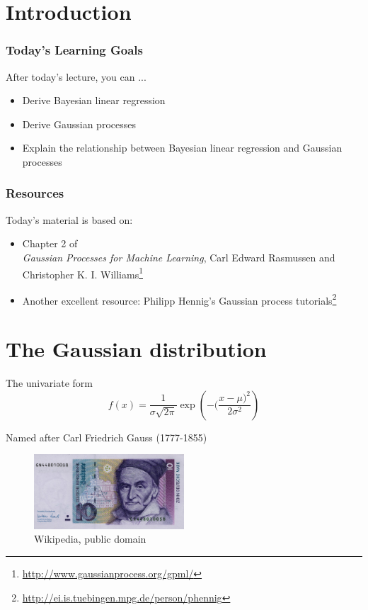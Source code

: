 
\section*{Introduction}
\begin{frame}
\frametitle{Today's Learning Goals}
After today's lecture, you can ...
\begin{itemize}
\item Derive Bayesian linear regression
\item Derive Gaussian processes
\item Explain the relationship between Bayesian linear regression and Gaussian processes
\end{itemize}

\end{frame}


\begin{frame}
\frametitle{Resources}
Today's material is based on:
\begin{itemize}
\item Chapter 2 of \\ \textit{Gaussian Processes for Machine Learning}, Carl Edward Rasmussen and Christopher K. I. Williams\footnote{\url{http://www.gaussianprocess.org/gpml/}}
\item Another excellent resource: Philipp Hennig’s Gaussian process tutorials\footnote{\url{http://ei.is.tuebingen.mpg.de/person/phennig}}

\end{itemize}
\end{frame}


\section{The Gaussian distribution}
\begin{frame}

\begin{block}{The univariate form}
\[f(x) = \frac{1}{\sigma\sqrt{2\pi}} \exp \left(-(\frac{x-\mu)^2}{2\sigma^2}\right)\]
\end{block}
\begin{center}
Named after Carl Friedrich Gauss (1777-1855)
\begin{figure}
    \includegraphics[width=0.5\textwidth]{images/plots/10-Deutsche-Mark.jpg}
    \caption{Wikipedia, public domain}
\end{figure}
\end{center}

\end{frame}

